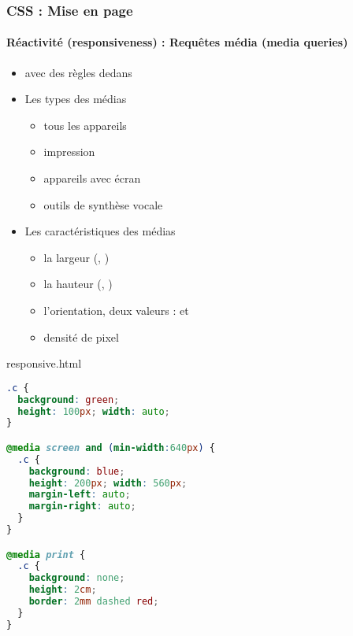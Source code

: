 \documentclass[xcolor=table]{beamer}
\begin{document}
\begin{frame}[fragile]
\frametitle{CSS : Mise en page}
\framesubtitle{Réactivité (responsiveness) : Requêtes média (media queries)}

\begin{minipage}{0.60\textwidth}
\begin{itemize}
	\item {} avec des règles dedans
	\item Les types des médias
	\begin{itemize}
		\item {} tous les appareils
		\item {} impression
		\item {} appareils avec écran
		\item {} outils de synthèse vocale
	\end{itemize}
	\item Les caractéristiques des médias
	\begin{itemize}
		\item {} la largeur (, )
		\item {} la hauteur (, )
		\item {} l'orientation, deux valeurs :  et 
		\item {} densité de pixel 
	\end{itemize}
\end{itemize}
\end{minipage}
%
\begin{minipage}{0.38\textwidth}
\begin{exampleblock}{responsive.html}
	\lstset{escapeinside=**}
	\tiny\bfseries\vspace{-6pt}
\begin{lstlisting}[language={CSS}]
.c {
  background: green;
  height: 100px; width: auto;
}

@media screen and (min-width:640px) {
  .c {
    background: blue;
    height: 200px; width: 560px;
    margin-left: auto;
    margin-right: auto;
  }
}

@media print {
  .c {
    background: none;
    height: 2cm;
    border: 2mm dashed red;
  }
}
\end{lstlisting}\vspace{-6pt}
\end{exampleblock}
\end{minipage}
\end{frame}
\end{document}
